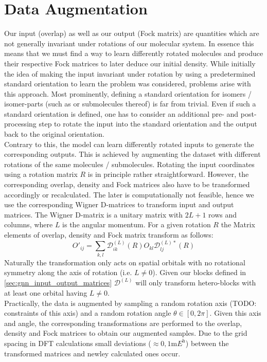 \section{Data Augmentation}
\label{subsec:gnn_data_augmentation}
Our input (overlap) as well as our output (Fock matrix) are quantities which are not generally invariant under rotations of our molecular system. In essence this means that we must find a way to learn differently rotated molecules and produce their respective Fock matrices to later deduce our initial density. While initially the idea of making the input invariant under rotation by using a predetermined standard orientation to learn the problem was considered, problems arise with this approach. Most prominently, defining a standard orientation for isomers / isomer-parts (such as  or submolecules thereof) is far from trivial. Even if such a standard orientation is defined, one has to consider an additional pre- and post-processing step to rotate the input into the standard orientation and the output back to the original orientation. \\
Contrary to this, the model can learn differently rotated inputs to generate the corresponding outputs. This is achieved by augmenting the dataset with different rotations of the same molecules / submolecules. Rotating the input coordinates using a rotation matrix $R$ is in principle rather straightforward. However, the corresponding overlap, density and Fock matrices also have to be transformed accordingly or recalculated. The later is computationally not feasible, hence we use the corresponding Wigner D-matrices to transform input and output matrices. 
The Wigner D-matrix is a unitary matrix with $2L + 1$ rows and columns, where $L$ is the angular momentum. For a given rotation $R$ the Matrix elements of overlap, density and Fock matrix transform as follows:
\begin{equation}
    O'_{ij} = \sum_{k,l} \mathcal{D}^{(L)}_{ik}(R) O_{kl} \mathcal{D}^{(L)*}_{lj}(R)
\end{equation}
Naturally the transformation only acts on spatial orbitals with no rotational symmetry along the axis of rotation (i.e. $L \neq 0$). Given our blocks defined in \autoref{sec:gnn_input_output_matrices} $\mathcal{D}^{(L)}$ will only transform hetero-blocks with at least one orbital having $L \neq 0$. \\

Practically, the data is augmented by sampling a random rotation axis (TODO: constraints of this axis) and a random rotation angle $\theta \in [0, 2\pi]$. Given this axis and angle, the corresponding transformations are performed to the overlap, density and Fock matrices to obtain our augmented samples. 
Due to the grid spacing in DFT calculations small deviations ($\approx 0,1 \unit{\milli\hartree}$) between the transformed matrices and newley calculated ones occur.

